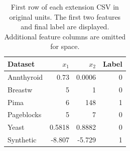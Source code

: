 \begin{table}[t]\centering\small
\begin{tabular}{lrrr}\toprule
Dataset & $x_1$ & $x_2$ & Label \\ \midrule
Annthyroid & 0.73 & 0.0006 & 0 \\
Breastw & 5 & 1 & 0 \\
Pima & 6 & 148 & 1 \\
Pageblocks & 5 & 7 & 0 \\
Yeast & 0.5818 & 0.8882 & 0 \\
Synthetic & -8.807 & -5.729 & 1 \\
\bottomrule\end{tabular}
\caption{First row of each extension CSV in original units. The first two features and final label are displayed. Additional feature columns are omitted for space.}\label{tab:snippet}
\end{table}
